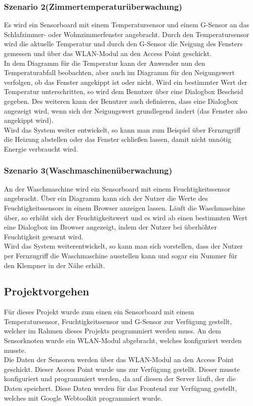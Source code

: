 \documentclass[12pt,a4paper,twoside]{article}
\begin{document}
\subsubsection{Szenario 2(Zimmertemperaturüberwachung)}
Es wird ein Sensorboard mit einem Temperatursensor und einem G-Sensor an das Schlafzimmer- oder Wohnzimmerfenster angebracht. Durch den Temperatursensor wird die aktuelle Temperatur und durch den G-Sensor die Neigung des Fensters gemessen und über das WLAN-Modul an den Access Point geschickt. \\
In dem Diagramm für die Temperatur kann der Anwender nun den Temperaturabfall beobachten, aber auch im Diagramm für den Neigungswert verfolgen, ob das Fenster angekippt ist oder nicht.
Wird ein bestimmter Wert der Temperatur unterschritten, so wird dem Benutzer über eine Dialogbox Bescheid gegeben. Des weiteren kann der Benutzer auch definieren, dass eine Dialogbox angezeigt wird, wenn sich der Neigungswert grundlegend ändert (das Fenster also angekippt wird). \\
Wird das System weiter entwickelt, so kann man zum Beispiel über Fernzugriff die Heizung abstellen oder das Fenster schließen lassen, damit nicht unnötig Energie verbraucht wird.

\subsubsection{Szenario 3(Waschmaschinenüberwachung)}
An der Waschmaschine wird ein Sensorboard mit einem Feuchtigkeitssensor angebracht. Über ein Diagramm kann sich der Nutzer die Werte des Feuchtigkeitssensors in einem Browser anzeigen lassen. Läuft die Waschmaschine über, so erhöht sich der Feuchtigkeitswert und es wird ab einen bestimmten Wert eine Dialogbox im Browser angezeigt, indem der Nutzer bei überhöhter Feuchtigkeit gewarnt wird. \\
Wird das System weiterentwickelt, so kann man sich vorstellen, dass der Nutzer per Fernzugriff die Waschmaschine ausstellen kann und sogar ein Nummer für den Klempner in der Nähe erhält.

\subsection{Projektvorgehen}
Für dieses Projekt wurde zum einen ein Sensorboard mit einem Temperatursensor, Feuchtigkeitssensor und G-Sensor zur Verfügung gestellt, welcher im Rahmen dieses Projekts programmiert werden muss. An dem Sensorknoten wurde ein WLAN-Modul abgebracht, welches konfiguriert werden musste.\\
Die Daten der Sensoren werden über das WLAN-Modul an den Access Point geschickt. Dieser Access Point wurde uns zur Verfügung gestellt. Dieser musste konfiguriert und programmiert werden, da auf diesen der Server läuft, der die Daten speichert. Diese Daten werden für das Frontend zur Verfügung gestellt, welches mit Google Webtoolkit programmiert wurde. 
\end{document}
